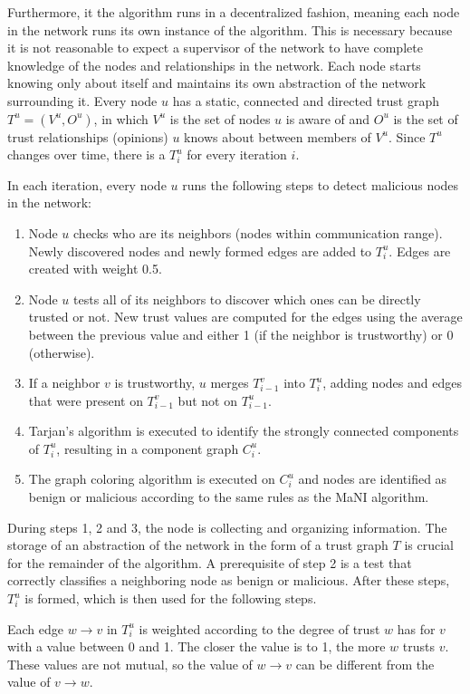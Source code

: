 \documentclass[conference]{IEEEtran}
\begin{document}
Furthermore, it the algorithm runs in a decentralized fashion, meaning each node in the network runs its own instance of the algorithm.
This is necessary because it is not reasonable to expect a supervisor of the network to have complete knowledge of the nodes and relationships in the network.
Each node starts knowing only about itself and maintains its own abstraction of the network surrounding it.
Every node $u$ has a static, connected and directed trust graph $T^u = (V^u, O^u)$, in which $V^u$ is the set of nodes $u$ is aware of and $O^u$ is the set of trust relationships (opinions) $u$ knows about between members of $V^u$.
Since $T^u$ changes over time, there is a $T^u_i$ for every iteration $i$.

In each iteration, every node $u$ runs the following steps to detect malicious nodes in the network:

\begin{enumerate}
	\item Node $u$ checks who are its neighbors (nodes within communication range).
		  Newly discovered nodes and newly formed edges are added to $T^u_i$.
		  Edges are created with weight 0.5.
	\item Node $u$ tests all of its neighbors to discover which ones can be directly trusted or not.
		  New trust values are computed for the edges using the average between the previous value and either 1 (if the neighbor is trustworthy) or 0 (otherwise).
	\item If a neighbor $v$ is trustworthy, $u$ merges $T^v_{i-1}$ into $T^u_i$, adding nodes and edges that were present on $T^v_{i-1}$ but not on $T^u_{i-1}$.
	\item Tarjan's algorithm is executed to identify the strongly connected components of $T^u_i$, resulting in a component graph $C^u_i$.
	\item The graph coloring algorithm is executed on $C^u_i$ and nodes are identified as benign or malicious according to the same rules as the MaNI algorithm.
\end{enumerate}

During steps 1, 2 and 3, the node is collecting and organizing information.
The storage of an abstraction of the network in the form of a trust graph $T$ is crucial for the remainder of the algorithm.
A prerequisite of step 2 is a test that correctly classifies a neighboring node as benign or malicious.
After these steps, $T^u_i$ is formed, which is then used for the following steps.

Each edge $w \rightarrow v$ in $T^u_i$ is weighted according to the degree of trust $w$ has for $v$ with a value between 0 and 1.
The closer the value is to 1, the more $w$ trusts $v$.
These values are not mutual, so the value of $w \rightarrow v$ can be different from the value of $v \rightarrow w$.
\end{document}
